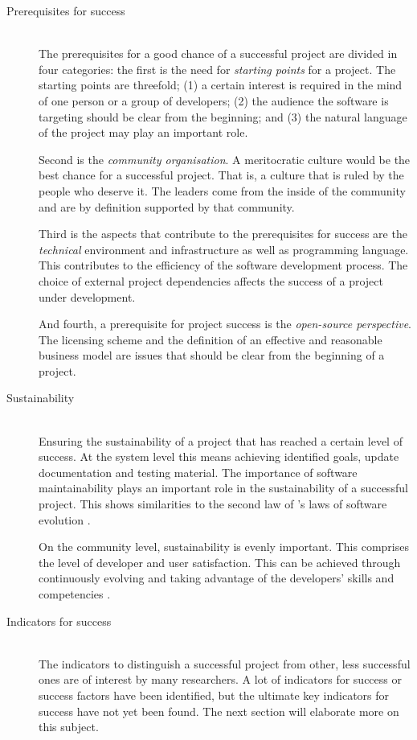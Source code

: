 \begin{description}
	\item[Prerequisites for success] \hfill \\ The prerequisites for a good
		chance of a successful project are divided in four categories: the first is
		the need for \textit{starting points} for a project. The starting points
		are threefold; (1) a certain interest is required in the mind of one person
		or a group of developers; (2) the audience the software is targeting
		should be clear from the beginning; and (3) the natural language of the
		project may play an important role.
		
		Second is the \textit{community organisation}. A meritocratic culture would
		be the best chance for a successful project. That is, a culture that is ruled
		by the people who deserve it. The leaders come from the inside of the
		community and are by definition supported by that community.
		
		Third is the aspects that contribute to the prerequisites for success are the
		\textit{technical} environment and infrastructure as well as programming
		language. This contributes to the efficiency of the software development
		process. The choice of external project dependencies affects the success of a
		project under development.
		
		And fourth, a prerequisite for project success is the \textit{open-source
		perspective}. The licensing scheme and the definition of an effective and
		reasonable business model are issues that should be clear from the beginning
		of a project.
		
	\item[Sustainability] \hfill \\ Ensuring the sustainability of a project
		that has reached a certain level of success. At the system level this means
		achieving identified goals, update documentation and testing material. The
		importance of software maintainability plays an important role in the
		sustainability of a successful project. This shows similarities to the second
		law of \citeauthor{lehman}'s laws of software evolution \cite{lehman}.
		
		On the community level, sustainability is evenly important. This comprises the
		level of developer and user satisfaction. This can be achieved through
		continuously evolving and taking advantage of the developers' skills and
		competencies \cite{androutsellis}.

	\item[Indicators for success] \hfill \\ The indicators to distinguish a
		successful project from other, less successful ones are of interest by
		many researchers. A lot of indicators for success or success factors have
		been identified, but the ultimate key indicators for success have not yet
		been found. The next section will elaborate more on this subject.
\end{description}


